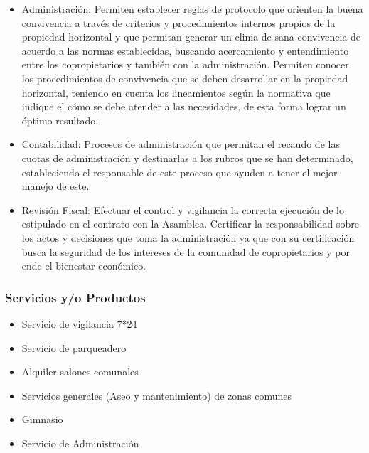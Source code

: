 \begin{itemize}
	
\item Administración: Permiten establecer reglas de protocolo que orienten la buena convivencia a través de criterios y procedimientos internos propios de la propiedad horizontal y que permitan generar un clima de sana convivencia de acuerdo a las normas establecidas, buscando acercamiento y entendimiento entre los copropietarios y también con la administración. Permiten conocer los procedimientos de convivencia que se deben desarrollar en la propiedad horizontal, teniendo en cuenta los lineamientos según la normativa que indique el cómo se debe atender a las necesidades, de esta forma lograr un óptimo resultado. 

\item Contabilidad: Procesos de administración que permitan el recaudo de las cuotas de administración y destinarlas a los rubros que se han determinado, estableciendo el responsable de este proceso que ayuden a tener el mejor manejo de este.

\item Revisión Fiscal: Efectuar el control y vigilancia la correcta ejecución de lo estipulado en el contrato con la Asamblea. Certificar la responsabilidad sobre los actos y decisiones que toma la administración ya que con su certificación busca la seguridad de los intereses de la comunidad de copropietarios y por ende el bienestar económico.
\end{itemize}

\subsubsection{Servicios y/o Productos}

\begin{itemize}
\item Servicio de vigilancia 7*24
\item Servicio de parqueadero
\item Alquiler salones comunales
\item Servicios generales (Aseo y mantenimiento) de zonas comunes
\item Gimnasio
\item Servicio de Administración
\end{itemize}
